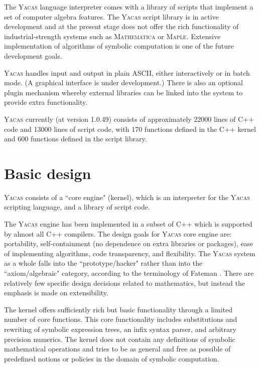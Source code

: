 \documentclass{llncs}
\begin{document}
The \textsc{Yacas} language interpreter comes with a library of scripts that implement a set of computer algebra features. The \textsc{Yacas} script library
is in active development and at the present stage does not offer the rich functionality of
industrial-strength systems such as \textsc{Mathematica} or \textsc{Maple}.
Extensive
implementation of algorithms of symbolic computation is one of the future
development goals.

\textsc{Yacas} handles input and output in plain ASCII,
either interactively or in batch mode. (A graphical interface is under development.) There is also an optional plugin mechanism
whereby external libraries can be linked into the system to provide extra
functionality.

\textsc{Yacas} currently (at version 1.0.49) consists of approximately 22000 lines of C++ code and  13000 lines of 
script code, with 170 functions defined in the C++ kernel and 600 functions
defined in the script library.


\section{Basic design}

\textsc{Yacas} consists of a ``core engine" (kernel), which is an interpreter
for the \textsc{Yacas} scripting language, and a library of script code.

The
\textsc{Yacas} engine has been implemented in a subset of C++ which is
supported by almost all C++ compilers.
The design goals for \textsc{Yacas} core engine are: portability,
self-containment (no dependence on extra libraries or packages), ease of
implementing algorithms, code transparency, and flexibility. The \textsc{Yacas}
system as a whole falls into the ``prototype/hacker" rather than into the
``axiom/algebraic" category, according to the terminology of Fateman
\cite{F90}. There are relatively few specific design decisions related to
mathematics, but instead the emphasis is made on extensibility.


The kernel offers sufficiently rich but basic functionality through a limited
number of core functions. This core functionality includes substitutions and
rewriting of symbolic expression trees, an infix syntax parser, and arbitrary
precision numerics. The kernel does not contain any definitions of symbolic
mathematical operations and tries to be as general and free as possible of
predefined notions or policies in the domain of symbolic computation.
\end{document}
